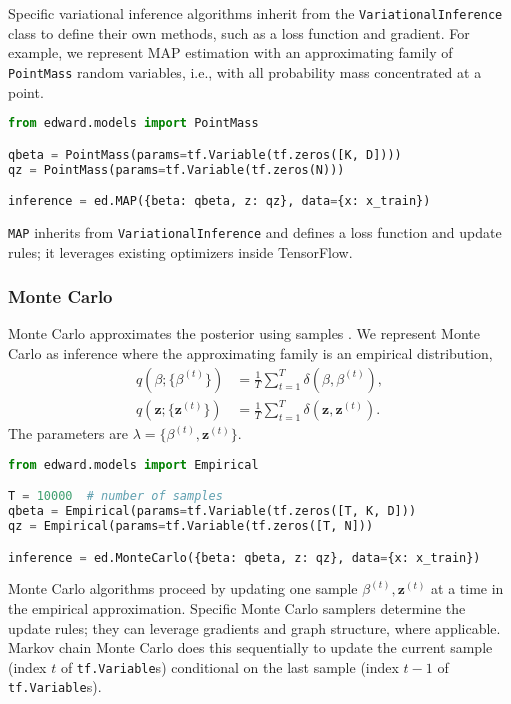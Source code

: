 Specific variational inference algorithms inherit from
the \texttt{VariationalInference} class to define their own methods, such as a
loss function and gradient.
For example, we represent MAP estimation with an approximating family
of \texttt{PointMass} random variables, i.e., with all probability
mass concentrated at a point.
\begin{lstlisting}[language=Python]
from edward.models import PointMass

qbeta = PointMass(params=tf.Variable(tf.zeros([K, D])))
qz = PointMass(params=tf.Variable(tf.zeros(N)))

inference = ed.MAP({beta: qbeta, z: qz}, data={x: x_train})
\end{lstlisting}
\texttt{MAP}
inherits from \texttt{VariationalInference} and defines a loss
function and update rules; it leverages existing optimizers inside TensorFlow.

\subsubsection{Monte Carlo}

Monte Carlo approximates the posterior using samples
\citep{robert1999monte}. We represent Monte Carlo as inference where
the approximating family is an empirical distribution,
\begin{align*}
q(\beta; \{\beta^{(t)}\})
&= \frac{1}{T}\sum_{t=1}^T \delta(\beta, \beta^{(t)}), \\[1.5ex]
q(\mathbf{z}; \{\mathbf{z}^{(t)}\})
&= \frac{1}{T}\sum_{t=1}^T \delta(\mathbf{z}, \mathbf{z}^{(t)}).
\end{align*}
The parameters are $\lambda=\{\beta^{(t)},\mathbf{z}^{(t)}\}$.
\begin{lstlisting}[language=Python]
from edward.models import Empirical

T = 10000  # number of samples
qbeta = Empirical(params=tf.Variable(tf.zeros([T, K, D]))
qz = Empirical(params=tf.Variable(tf.zeros([T, N]))

inference = ed.MonteCarlo({beta: qbeta, z: qz}, data={x: x_train})
\end{lstlisting}
Monte Carlo
algorithms proceed by updating one sample $\beta^{(t)},\mathbf{z}^{(t)}$ at a time in the empirical
approximation.
Specific Monte Carlo samplers determine the update rules;
they can leverage gradients and graph structure, where applicable.
Markov chain Monte Carlo does this sequentially to update
the current sample (index $t$ of \texttt{tf.Variable}s) conditional on
the last sample (index $t-1$ of \texttt{tf.Variable}s).

